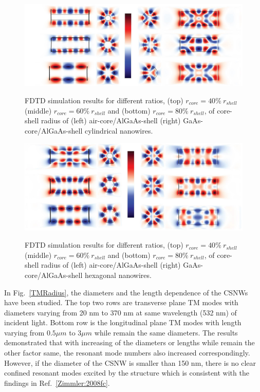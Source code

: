 \begin{figure}
  \caption{FDTD simulation results for different ratios, (top) $r_{core} = 40\%\ r_{shell}$ (middle) $r_{core} = 60\%\ r_{shell}$ and (bottom) $r_{core} = 80\%\ r_{shell}$, of core-shell radius of (left) air-core/AlGaAs-shell (right) GaAs-core/AlGaAs-shell cylindrical nanowires.}
  \centering
  \includegraphics[width=\textwidth]{pictures/LM/CylinRP}
  \label{CylinRP}
\end{figure}

\begin{figure}
  \caption{FDTD simulation results for different ratios, (top) $r_{core} = 40\%\ r_{shell}$ (middle) $r_{core} = 60\%\ r_{shell}$ and (bottom) $r_{core} = 80\%\ r_{shell}$, of core-shell radius of (left) air-core/AlGaAs-shell (right) GaAs-core/AlGaAs-shell hexagonal nanowires.}
  \centering
  \includegraphics[width=\textwidth]{pictures/LM/HexRP}
  \label{HexRP}
\end{figure}

In Fig.~\ref{TMRadius}, the diameters and the length dependence of the CSNWs
have been studied. The top two rows are transverse plane TM modes with
diameters varying from 20 nm to 370 nm at same wavelength (532 nm) of incident
light. Bottom row is the longitudinal plane TM modes with length varying from
$0.5 \mu{m}$ to $3 \mu{m}$ while remain the same diameters. The results
demonstrated that with increasing of the diameters or lengths while remain the
other factor same, the resonant mode numbers also increased correspondingly.
However, if the diameter of the CSNW is smaller than 150 nm, there is no clear
confined resonant modes excited by the structure which is consistent with the
findings in Ref.~\ref{Zimmler:2008fc}.

